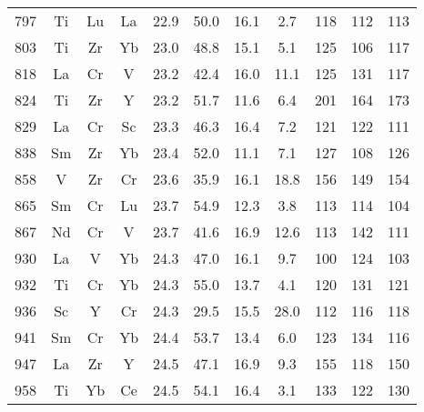 \begin{center}
\begin{xtabular}{c|ccc|cccc|ccc}
 797 &   Ti &   Lu &   La & 22.9 & 50.0 & 16.1 &  2.7 &  118 &  112 &  113 \\
 803 &   Ti &   Zr &   Yb & 23.0 & 48.8 & 15.1 &  5.1 &  125 &  106 &  117 \\
 818 &   La &   Cr &    V & 23.2 & 42.4 & 16.0 & 11.1 &  125 &  131 &  117 \\
 824 &   Ti &   Zr &    Y & 23.2 & 51.7 & 11.6 &  6.4 &  201 &  164 &  173 \\
 829 &   La &   Cr &   Sc & 23.3 & 46.3 & 16.4 &  7.2 &  121 &  122 &  111 \\
 838 &   Sm &   Zr &   Yb & 23.4 & 52.0 & 11.1 &  7.1 &  127 &  108 &  126 \\
 858 &    V &   Zr &   Cr & 23.6 & 35.9 & 16.1 & 18.8 &  156 &  149 &  154 \\
 865 &   Sm &   Cr &   Lu & 23.7 & 54.9 & 12.3 &  3.8 &  113 &  114 &  104 \\
 867 &   Nd &   Cr &    V & 23.7 & 41.6 & 16.9 & 12.6 &  113 &  142 &  111 \\
 930 &   La &    V &   Yb & 24.3 & 47.0 & 16.1 &  9.7 &  100 &  124 &  103 \\
 932 &   Ti &   Cr &   Yb & 24.3 & 55.0 & 13.7 &  4.1 &  120 &  131 &  121 \\
 936 &   Sc &    Y &   Cr & 24.3 & 29.5 & 15.5 & 28.0 &  112 &  116 &  118 \\
 941 &   Sm &   Cr &   Yb & 24.4 & 53.7 & 13.4 &  6.0 &  123 &  134 &  116 \\
 947 &   La &   Zr &    Y & 24.5 & 47.1 & 16.9 &  9.3 &  155 &  118 &  150 \\
 958 &   Ti &   Yb &   Ce & 24.5 & 54.1 & 16.4 &  3.1 &  133 &  122 &  130 \\
\end{xtabular}
\end{center}

\clearpage

